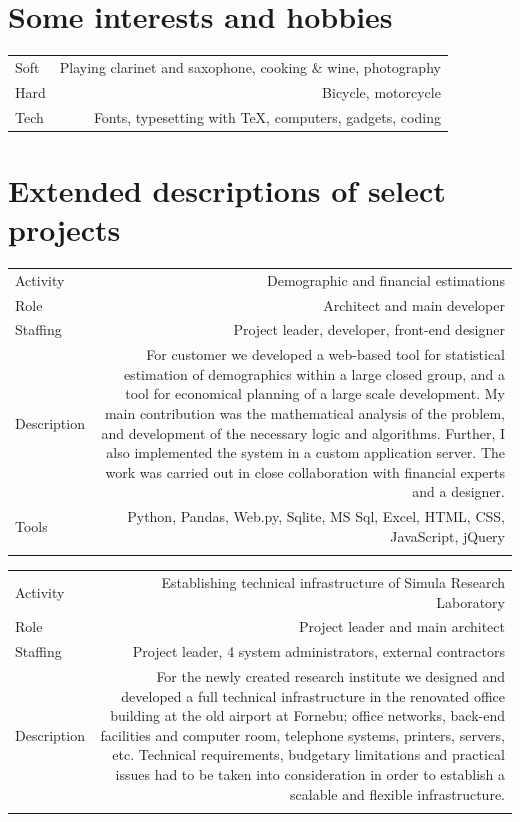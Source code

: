 \documentclass[english,a4paper,11pt]{article}
\begin{document}
\section*{Some interests and hobbies}
\begin{tabular}{LR}
Soft & Playing clarinet and saxophone, cooking \& wine, photography \\
Hard & Bicycle, motorcycle \\
Tech & Fonts, typesetting with \TeX, computers, gadgets, coding
\end{tabular}

\section*{Extended descriptions of select projects}

\begin{tabular}{@{}LR}
Activity & Demographic and financial estimations \\
Role & Architect and main developer \\
Staffing & Project leader, developer, front-end designer \\
Description & For customer we developed a web-based tool for statistical estimation of demographics within a large closed group, and a tool for economical planning of a large scale development. My main contribution was the mathematical analysis of the problem, and development of the necessary logic and algorithms. Further, I also implemented the system in a custom application server. The work was carried out in close collaboration with financial experts and a designer. \\
Tools & Python, Pandas, Web.py, Sqlite, MS Sql, Excel, HTML, CSS, JavaScript, jQuery  \\ 
\addlinespace \bottomrule[.1pt] \addlinespace
\end{tabular}

\begin{tabular}{@{}LR}
Activity & Establishing technical infrastructure of Simula Research Laboratory \\
Role & Project leader and main architect \\
Staffing & Project leader, 4 system administrators, external contractors \\
Description & For the newly created research institute we designed and developed a full technical infrastructure in the renovated office building at the old airport at Fornebu; office networks, back-end facilities and computer room, telephone systems, printers, servers, etc. Technical requirements, budgetary limitations and practical issues had to be taken into consideration in order to establish a scalable and flexible infrastructure.  \\ 
\addlinespace \bottomrule[.1pt] \addlinespace
\end{tabular}
\end{document}
